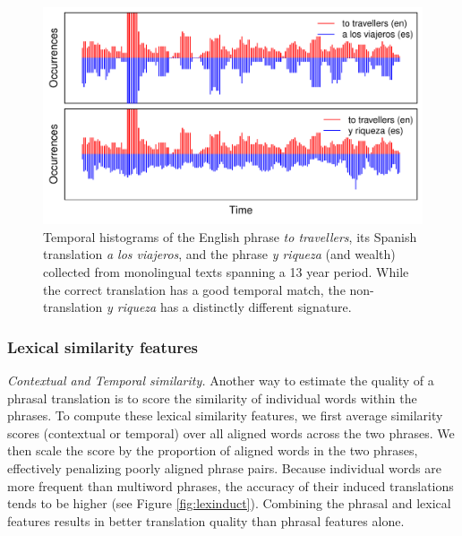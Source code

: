\documentclass[11pt]{article}
\newcommand{\mtodo}[1]{}
\newcommand{\paraheader}[1]{\vskip 0.05in \noindent\emph{#1}}
\begin{document}
\begin{figure}[t]
\includegraphics[width= \linewidth]{../figures/temporal/temporal}
\caption{Temporal histograms of the English phrase {\em to travellers}, its Spanish translation {\em a los viajeros}, and the phrase {\em y riqueza} (and wealth) collected from monolingual texts spanning a 13 year period. While the correct translation has a good temporal match, the non-translation {\em y riqueza} has a distinctly different signature.}
\label{fig:temporal}
\end{figure}




\subsubsection{Lexical similarity features}  \label{sect:lexfeats}

\paraheader{Contextual and Temporal similarity.}  Another way to estimate the quality of a phrasal translation is to score the similarity of individual words within the phrases.  To compute these lexical similarity features, we first average similarity scores (contextual or temporal) over all aligned words across the two phrases.  We then scale the score by the proportion of aligned words in the two phrases, effectively penalizing poorly aligned phrase pairs. Because individual words are more frequent than multiword phrases, the accuracy of their induced translations tends to be higher (see Figure \ref{fig:lexinduct}). Combining the phrasal and lexical features results in better translation quality than phrasal features alone. \mtodo{Mention that it is the average of both forward and backward alignments?}
\end{document}
